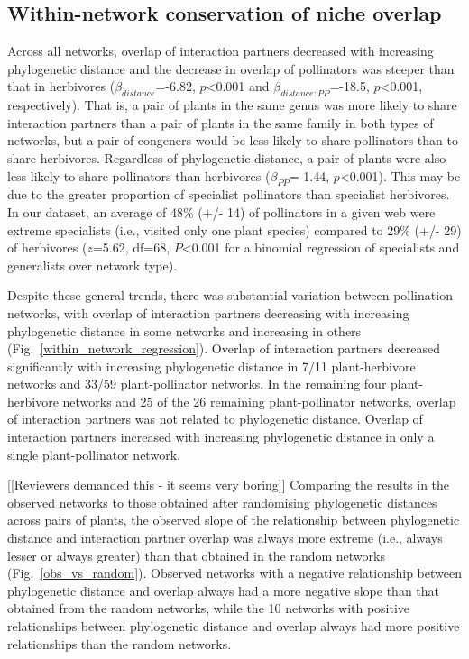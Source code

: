 \documentclass[12pt]{article}
\begin{document}
\begin{spacing}{1.5}
  \subsection*{Within-network conservation of niche overlap}

    Across all networks, overlap of interaction partners decreased with increasing phylogenetic distance and the decrease in overlap of pollinators was steeper than that in herbivores ($\beta_{distance}$=-6.82, $p$\textless0.001 and $\beta_{distance:PP}$=-18.5, $p$\textless0.001, respectively). That is, a pair of plants in the same genus was more likely to share interaction partners than a pair of plants in the same family in both types of networks, but a pair of congeners would be less likely to share pollinators than to share herbivores. Regardless of phylogenetic distance, a pair of plants were also less likely to share pollinators than herbivores ($\beta_{PP}$=-1.44, $p$\textless0.001). This may be due to the greater proportion of
    specialist pollinators than specialist herbivores. In our dataset, an
    average of 48\% (+/- 14) of pollinators in a given web were extreme 
    specialists (i.e., visited only one plant species) compared to 29\% 
    (+/- 29) of herbivores ($z$=5.62, df=68, $P$\textless0.001 
    for a binomial regression of specialists and generalists over network
    type). %
 

    Despite these general trends, there was substantial variation between 
    pollination networks, with overlap of interaction partners decreasing 
    with increasing phylogenetic distance in some networks and increasing in 
    others (Fig.~\ref{within_network_regression}). Overlap of interaction partners decreased significantly with increasing phylogenetic distance in 7/11 plant-herbivore networks and 33/59 plant-pollinator networks. In the remaining four plant-herbivore networks and 25 of the 26 remaining plant-pollinator networks, overlap of interaction partners was not related to phylogenetic distance. Overlap of interaction partners increased with increasing phylogenetic distance in only a single plant-pollinator network.%


    [[Reviewers demanded this - it seems very boring]]
    Comparing the results in the observed networks to those obtained after randomising phylogenetic distances across pairs of plants, the observed slope of the relationship between phylogenetic distance and interaction partner overlap was always more extreme (i.e., always lesser or always greater) than that obtained in the random networks (Fig.~\ref{obs_vs_random}). Observed networks with a negative relationship between phylogenetic distance and overlap always had a more negative slope than that obtained from the random networks, while the 10 networks with positive relationships between phylogenetic distance and overlap always had more positive relationships than the random networks.



\end{spacing}
\end{document}
